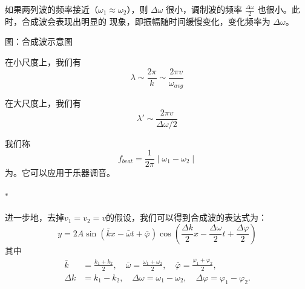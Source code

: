 如果两列波的频率接近（\(\omega_1 \approx \omega_2\)），则 \(\Delta \omega\) 很小，调制波的频率 \(\frac{\Delta \omega}{2}\) 也很小。此时，合成波会表现出明显的  现象，即振幅随时间缓慢变化，变化频率为 \(\Delta \omega\)。

\begin{center}
    \par
    图\thefigure：合成波示意图
\end{center}

\begin{Itemize}
    \item 在小尺度上，我们有
    \[\lambda \sim \frac{2\pi}{k} \sim \frac{2\pi v}{\omega_{avg}}\]
    \item 在大尺度上，我们有
    \[\lambda' \sim \frac{2\pi v}{\Delta \omega/2}\]
\end{Itemize}

我们称
\[f_{beat}=\frac{1}{2\pi}\mid \omega_1-\omega_2\mid\]
为。它可以应用于乐器调音。
\subsubsection[波包$^*$]{$^*$}
进一步地，去掉\(v_1=v_2=v\)的假设，我们可以得到合成波的表达式为：
\[
    y = 2A \sin\left(\bar{k}x - \bar{\omega}t + \bar{\varphi}\right) \cos\left(\frac{\Delta k}{2}x - \frac{\Delta \omega}{2}t + \frac{\Delta \varphi}{2}\right)
\]
其中
\[
    \begin{aligned}
        \bar{k}  & = \frac{k_1 + k_2}{2}, \quad \bar{\omega} = \frac{\omega_1 + \omega_2}{2}, \quad \bar{\varphi} = \frac{\varphi_1 + \varphi_2}{2}, \\
        \Delta k & = k_1 - k_2, \quad \Delta \omega = \omega_1 - \omega_2, \quad \Delta \varphi = \varphi_1 - \varphi_2.
    \end{aligned}
\]

